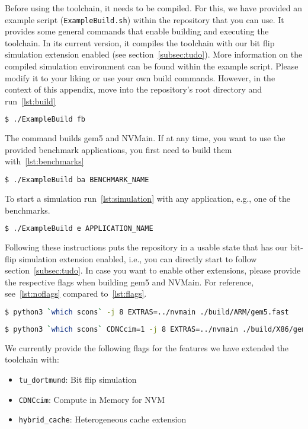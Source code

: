 Before using the toolchain, it needs to be compiled. For this, we have provided an example script
(\texttt{ExampleBuild.sh}) within the repository that you can use. It provides some general
commands that enable building and executing the toolchain. In its current version, it compiles the
toolchain with our bit flip simulation extension enabled (see section~\cref{subsec:tudo}). More
information on the compiled simulation environment can be found within the example script. Please
modify it to your liking or use your own build commands. However, in the context of this appendix, move into
the repository's root directory and run~\cref{lst:build}
\begin{lstlisting}[caption={Build gem5 and NVMain},label=lst:build,language=bash]
$ ./ExampleBuild fb
\end{lstlisting}
The command builds gem5 and NVMain. If at any time, you want to use the provided benchmark
applications, you first need to build them with~\cref{lst:benchmarks}
\begin{lstlisting}[caption={Build benchmarks},label=lst:benchmarks,language=bash]
$ ./ExampleBuild ba BENCHMARK_NAME
\end{lstlisting}

To start a simulation run~\cref{lst:simulation} with any application, e.g., one of the benchmarks.
\begin{lstlisting}[caption={Run simulation},label=lst:simulation,language=bash]
$ ./ExampleBuild e APPLICATION_NAME
\end{lstlisting}

Following these instructions puts the repository in a usable state that has our bit-flip simulation
extension enabled, i.e., you can directly start to follow section~\cref{subsec:tudo}. In case you
want to enable other extensions, please provide the respective flags when building gem5 and NVMain.
For reference, see~\cref{lst:noflags} compared to~\cref{lst:flags}.
\begin{lstlisting}[caption={Build without flags},label=lst:noflags,language=bash]
$ python3 `which scons` -j 8 EXTRAS=../nvmain ./build/ARM/gem5.fast
\end{lstlisting}
\begin{lstlisting}[caption={Build with the \texttt{CDNCcim} flag for X86 architecture, without the NVMain extension},label=lst:flags,language=bash]
$ python3 `which scons` CDNCcim=1 -j 8 EXTRAS=../nvmain ./build/X86/gem5.fast
\end{lstlisting}
We currently provide the following flags for the features we have extended the toolchain with:
\begin{itemize}
    \item \texttt{tu\_dortmund}: Bit flip simulation
	\item \texttt{CDNCcim}: Compute in Memory for NVM
	\item \texttt{hybrid\_cache}: Heterogeneous cache extension
\end{itemize}

